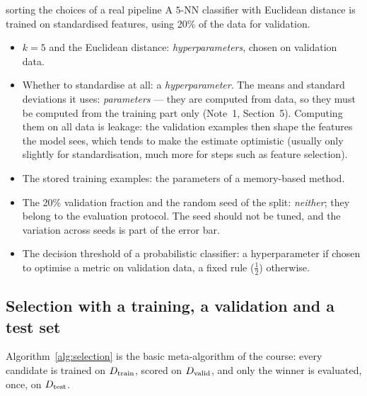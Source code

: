 \documentclass[11pt]{article}
\begin{document}
\begin{worked}{sorting the choices of a real pipeline}
A $5$-NN classifier with Euclidean distance is trained on standardised features, using 20\% of the data for
validation.
\begin{itemize}
\item $k = 5$ and the Euclidean distance: \emph{hyperparameters}, chosen on validation data.
\item Whether to standardise at all: a \emph{hyperparameter}. The means and standard deviations it uses:
\emph{parameters} --- they are computed from data, so
they must be computed from the training part only (Note~1, Section~5). Computing them on all data is leakage: the
validation examples then shape the features the model sees, which tends to make the estimate optimistic (usually only
slightly for standardisation, much more for steps such as feature selection).
\item The stored training examples: the parameters of a memory-based method.
\item The 20\% validation fraction and the random seed of the split: \emph{neither}; they belong to the evaluation
protocol. The seed should not be tuned, and the variation across seeds is part of the error bar.
\item The decision threshold of a probabilistic classifier: a hyperparameter if chosen to optimise a metric on
validation data, a fixed rule ($\frac12$) otherwise.
\end{itemize}
\end{worked}

\subsection{Selection with a training, a validation and a test set}

Algorithm~\ref{alg:selection} is the basic meta-algorithm of the course: every candidate is trained on $D_{\mathrm{train}}$,
scored on $D_{\mathrm{valid}}$, and only the winner is evaluated, once, on $D_{\mathrm{test}}$.
\end{document}
